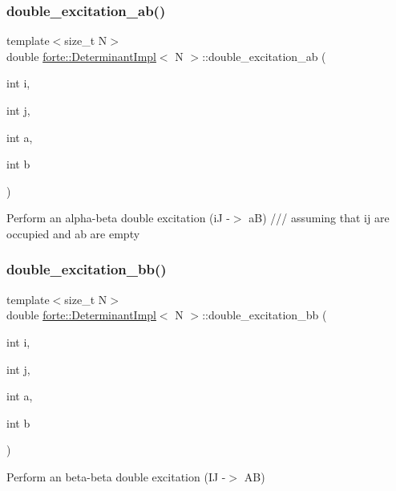 \subsubsection{\texorpdfstring{double\+\_\+excitation\+\_\+ab()}{double\_excitation\_ab()}}
{\footnotesize\ttfamily template$<$size\+\_\+t N$>$ \\
double \mbox{\hyperlink{classforte_1_1_determinant_impl}{forte\+::\+Determinant\+Impl}}$<$ N $>$\+::double\+\_\+excitation\+\_\+ab (\begin{DoxyParamCaption}\item[{int}]{i,  }\item[{int}]{j,  }\item[{int}]{a,  }\item[{int}]{b }\end{DoxyParamCaption})\hspace{0.3cm}{\ttfamily [inline]}}

Perform an alpha-\/beta double excitation (iJ -\/$>$ aB) /// assuming that ij are occupied and ab are empty \mbox{\label{classforte_1_1_determinant_impl_a1ddb5fecd7e198cfcc6d5bc61a7ca866}} 
\subsubsection{\texorpdfstring{double\+\_\+excitation\+\_\+bb()}{double\_excitation\_bb()}}
{\footnotesize\ttfamily template$<$size\+\_\+t N$>$ \\
double \mbox{\hyperlink{classforte_1_1_determinant_impl}{forte\+::\+Determinant\+Impl}}$<$ N $>$\+::double\+\_\+excitation\+\_\+bb (\begin{DoxyParamCaption}\item[{int}]{i,  }\item[{int}]{j,  }\item[{int}]{a,  }\item[{int}]{b }\end{DoxyParamCaption})\hspace{0.3cm}{\ttfamily [inline]}}



Perform an beta-\/beta double excitation (IJ -\/$>$ AB) 

\mbox{\label{classforte_1_1_determinant_impl_a14a47fa6165d685967ce1c8554c7d3cc}} 
